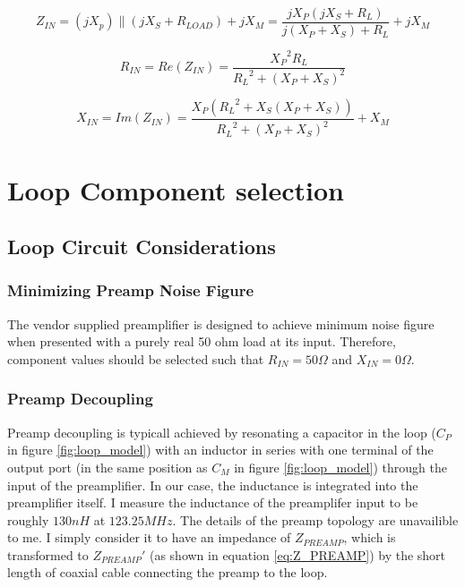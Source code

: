 \begin{equation} \label{eq:Z_IN}
    Z_{IN}=(jX_p)\parallel(jX_S+R_{LOAD})+jX_M = \frac{j X_P (j X_S + R_L)}{j (X_P + X_S) + R_L} + j X_M
\end{equation}

\begin{equation} \label{eq:R_IN}
    R_{IN}=Re(Z_{IN})=\frac{{X_P}^2 R_L}{{R_L}^2+(X_P+X_S)^2}
\end{equation}

\begin{equation} \label{eq:X_IN}
    X_{IN}= Im(Z_{IN}) = \frac{X_P ({R_L}^2 + X_S(X_P+X_S))}{{R_L}^2+(X_P+X_S)^2}+X_M
\end{equation}

\section{Loop Component selection}



\subsection{Loop Circuit Considerations}
\subsubsection{Minimizing Preamp Noise Figure}
The vendor supplied preamplifier is designed to achieve minimum noise figure when presented with a purely real 50 ohm 
load at its input. Therefore, component values should be selected such that $R_{IN}=50\Omega$ and $X_{IN}=0\Omega$.
\subsubsection{Preamp Decoupling}
Preamp decoupling is typicall achieved by resonating a capacitor in the loop ($C_P$ in figure \ref{fig:loop_model}) with
an inductor in series with one terminal of the output port (in the same position as $C_M$ in figure
\ref{fig:loop_model}) through the input of the preamplifier. In our case, the inductance is integrated into the
preamplifier itself. I measure the inductance of the preamplifer input to be roughly $130nH$ at $123.25 MHz$. The
details of the preamp topology are unavailible to me. I simply consider it to have an impedance of $Z_{PREAMP}$, which
is transformed to ${Z_{PREAMP}}'$ (as shown in equation \ref{eq:Z_PREAMP}) by the short length of coaxial cable
connecting the preamp to the loop.


